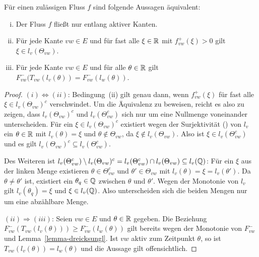 \begin{lemma}\label{lemma-only-active-edges}
	Für einen zulässigen Fluss $f$ sind folgende Aussagen äquivalent:
	\begin{enumerate}[(i)]
		\item Der Fluss $f$ fließt nur entlang aktiver Kanten.
		\item Für jede Kante $vw\in E$ und für fast alle $\xi\in\mathbb{R}$ mit	$f_{vw}^+(\xi)>0$ gilt $\xi \in l_v(\Theta_{vw})$.
		\item Für jede Kante $vw\in E$ und für alle $\theta\in\mathbb{R}$ gilt $F_{vw}^-(T_{vw}(l_v(\theta)) = F_{vw}^-(l_w(\theta))$.
	\end{enumerate}
\end{lemma}
\begin{proof}
	$(i) \Leftrightarrow (ii)$: Bedingung~(ii) gilt genau dann, wenn $f_{vw}^+(\xi)$ für fast alle $\xi\in l_v(\Theta_{vw})^c$ verschwindet.
	Um die Äquivalenz zu beweisen, reicht es also zu zeigen, dass $l_v(\Theta_{vw})^c$ und $l_v(\Theta_{vw}^c)$ sich nur um eine Nullmenge voneinander unterscheiden.
	Für ein $\xi\in l_v(\Theta_{vw})^c$ existiert wegen der Surjektivität () von $l_v$ ein $\theta\in\mathbb{R}$ mit $l_v(\theta)=\xi$ und $\theta\notin\Theta_{vw}$, da $\xi\notin l_v(\Theta_{vw})$. 
	Also ist $\xi\in l_v(\Theta_{vw}^c)$ und es gilt $l_v(\Theta_{vw})^c\subseteq l_v(\Theta_{vw}^c)$.
	
	Des Weiteren ist $l_v(\Theta_{vw}^c)\setminus l_v(\Theta_{vw})^c = l_v(\Theta_{vw}^c)\cap l_v(\Theta_{vw})\subseteq l_v(\mathbb{Q})$:
	Für ein $\xi$ aus der linken Menge existieren $\theta\in\Theta_{vw}^c$ und $\theta'\in\Theta_{vw}$ mit $l_v(\theta)=\xi=l_v(\theta')$.
	Da $\theta\neq\theta'$ ist, existiert ein $\theta_q\in\mathbb{Q}$ zwischen $\theta$ und $\theta'$.
	Wegen der Monotonie von $l_v$ gilt $l_v(\theta_q)=\xi$ und $\xi\in l_v(\mathbb{Q})$.
	Also unterscheiden sich die beiden Mengen nur um eine abzählbare Menge.
	
	$(ii)\Rightarrow (iii)$: Seien $vw\in E$ und $\theta\in\mathbb{R}$ gegeben.
	Die Beziehung $F_{vw}^-(T_{vw}(l_v(\theta))) \geq F_{vw}^-(l_w(\theta))$ gilt bereits wegen der Monotonie von $F_{vw}^-$ und Lemma~\ref{lemma-dreicksungl}.
	Ist $vw$ aktiv zum Zeitpunkt $\theta$, so ist $T_{vw}(l_v(\theta))=l_w(\theta)$ und die Aussage gilt offensichtlich.
	

\end{proof}
